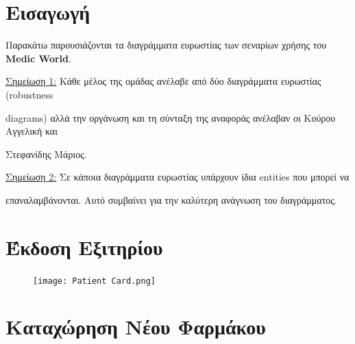\documentclass{article}
\begin{document}
{
  \hypersetup{linkcolor=black}
  \tableofcontents
}

\section{Εισαγωγή}

Παρακάτω παρουσιάζονται τα διαγράμματα ευρωστίας των σεναρίων χρήσης του \textbf{Medic World}. \vspace{0.2cm}

\underline{Σημείωση 1:} Κάθε μέλος της ομάδας ανέλαβε από δύο διαγράμματα ευρωστίας (robustness \par diagrams) αλλά την οργάνωση και τη σύνταξη της αναφοράς ανέλαβαν οι Κούρου Αγγελική και \par Στεφανίδης Μάριος. \vspace{0.2cm}

\underline{Σημείωση 2:} Σε κάποια διαγράμματα ευρωστίας υπάρχουν ίδια entities που μπορεί να \par επαναλαμβάνονται. Αυτό συμβαίνει για την καλύτερη ανάγνωση του διαγράμματος.


\newpage

\section{Έκδοση Εξιτηρίου}

\vspace{0.2cm}

\begin{figure}[!htb]
        \centering
        \texttt{[image: Patient Card.png]}
\end{figure}

\newpage

\section{Καταχώρηση Νέου Φαρμάκου}

\vspace{0.2cm}
\end{document}
